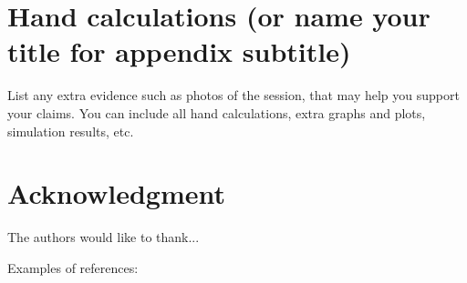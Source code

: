\documentclass[journal]{IEEEtran}
\begin{document}
%


\appendices
\section{Hand calculations (or name your title for appendix subtitle)}
List any extra evidence such as photos of the session, that may help you support your claims.
You can include all hand calculations, extra graphs and plots, simulation results, etc. 

\section*{Acknowledgment}
The authors would like to thank...




%
%
%


\printbibliography


Examples of references:  \\[0.001in]
\end{document}
